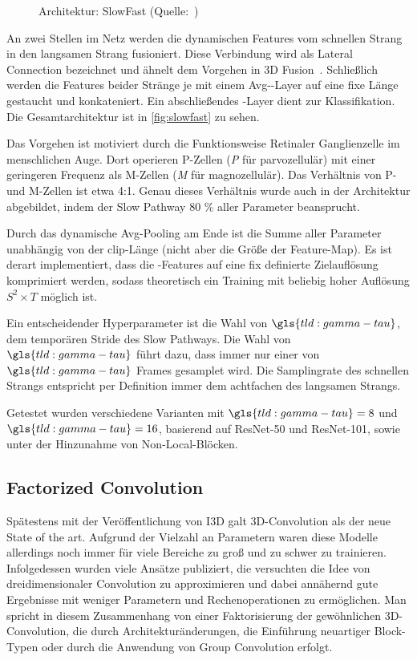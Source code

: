 \begin{figure}[h!]
    \centering
    \caption{Architektur: SlowFast (Quelle:~\cite{Feichtenhofer18})}
    \label{fig:slowfast}
\end{figure}

An zwei Stellen im Netz werden die dynamischen Features vom schnellen Strang in den langsamen Strang fusioniert.
Diese Verbindung wird als Lateral Connection bezeichnet und ähnelt dem Vorgehen in 3D Fusion~\cite{Feichtenhofer16}.
Schließlich werden die Features beider Stränge je mit einem Avg-\pool-Layer auf eine fixe Länge gestaucht und konkateniert.
Ein abschließendes \fc-Layer dient zur Klassifikation.
Die Gesamtarchitektur ist in \autoref{fig:slowfast} zu sehen.

Das Vorgehen ist motiviert durch die Funktionsweise Retinaler Ganglienzelle im menschlichen Auge.
Dort operieren P-Zellen (\emph{P} für parvozellulär) mit einer geringeren Frequenz als M-Zellen (\emph{M} für magnozellulär).
Das Verhältnis von P- und M-Zellen ist etwa 4:1.
Genau dieses Verhältnis wurde auch in der Architektur abgebildet, indem der Slow Pathway 80 \% aller Parameter beansprucht.

Durch das dynamische Avg-Pooling am Ende ist die Summe aller Parameter unabhängig von der \gls{clip}-Länge (nicht aber die Größe der Feature-Map).
Es ist derart implementiert, dass die \conv-Features auf eine fix definierte Zielauflösung komprimiert werden, sodass theoretisch ein Training mit beliebig hoher Auflösung $S^2 \times T$ möglich ist.

Ein entscheidender Hyperparameter ist die Wahl von $\gls{tld:gamma-tau}$, dem temporären Stride des Slow Pathways.
Die Wahl von $\gls{tld:gamma-tau}$ führt dazu, dass immer nur einer von $\gls{tld:gamma-tau}$ Frames gesamplet wird.
Die Samplingrate des schnellen Strangs entspricht per Definition immer dem achtfachen des langsamen Strangs.

Getestet wurden verschiedene Varianten mit $\gls{tld:gamma-tau} = 8$ und $\gls{tld:gamma-tau} = 16$, basierend auf ResNet-50 und ResNet-101, sowie unter der Hinzunahme von Non-Local-Blöcken.

\subsection{Factorized Convolution}
\label{subsec:factorized-convolution}

Spätestens mit der Veröffentlichung von I3D galt 3D-Convolution als der neue State of the art.
Aufgrund der Vielzahl an Parametern waren diese Modelle allerdings noch immer für viele Bereiche zu groß und zu schwer zu trainieren.
Infolgedessen wurden viele Ansätze publiziert, die versuchten die Idee von dreidimensionaler Convolution zu approximieren und dabei annähernd gute Ergebnisse mit weniger Parametern und Rechenoperationen zu ermöglichen.
Man spricht in diesem Zusammenhang von einer Faktorisierung der gewöhnlichen 3D-Convolution, die durch Architekturänderungen, die Einführung neuartiger Block-Typen oder durch die Anwendung von Group Convolution erfolgt.

